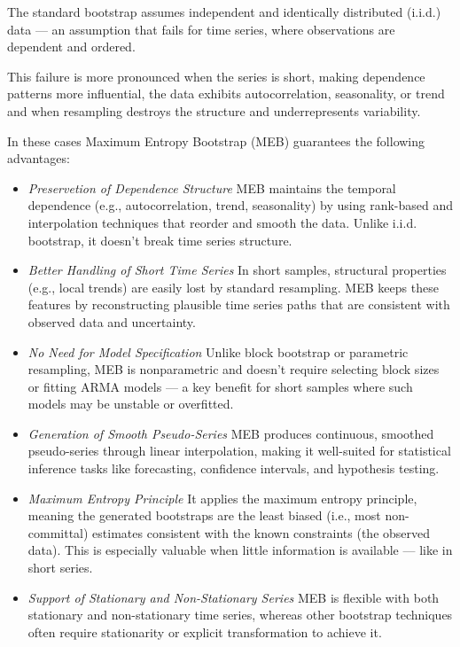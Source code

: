 \documentclass[opre,sglanonrev,11pt]{informs4}
\begin{document}

The standard bootstrap assumes independent and identically distributed (i.i.d.) data — an assumption that fails for time series, where observations are dependent and ordered.

This failure is more pronounced when the series is short, making dependence patterns more influential, the data exhibits autocorrelation, seasonality, or trend and when resampling destroys the structure and underrepresents variability.

In these cases Maximum Entropy Bootstrap (MEB) guarantees the following advantages:

\begin{itemize}
	\item {\it Preservetion of Dependence Structure } MEB maintains the temporal dependence (e.g., autocorrelation, trend, seasonality) by using rank-based and interpolation techniques that reorder and smooth the data. Unlike i.i.d. bootstrap, it doesn’t break time series structure.
	
	\item {\it Better Handling of Short Time Series } In short samples, structural properties (e.g., local trends) are easily lost by standard resampling. MEB keeps these features by reconstructing plausible time series paths that are consistent with observed data and uncertainty.
	
	\item {\it No Need for Model Specification} Unlike block bootstrap or parametric resampling, MEB is nonparametric and doesn’t require selecting block sizes or fitting ARMA models — a key benefit for short samples where such models may be unstable or overfitted.
	
	\item {\it Generation of Smooth Pseudo-Series} MEB produces continuous, smoothed pseudo-series through linear interpolation, making it well-suited for statistical inference tasks like forecasting, confidence intervals, and hypothesis testing.
	
	\item {\it Maximum Entropy Principle} It applies the maximum entropy principle, meaning the generated bootstraps are the least biased (i.e., most non-committal) estimates consistent with the known constraints (the observed data). This is especially valuable when little information is available — like in short series.
	
	\item {\it Support of Stationary and Non-Stationary Series} MEB is flexible with both stationary and non-stationary time series, whereas other bootstrap techniques often require stationarity or explicit transformation to achieve it.
\end{itemize}
\end{document}
